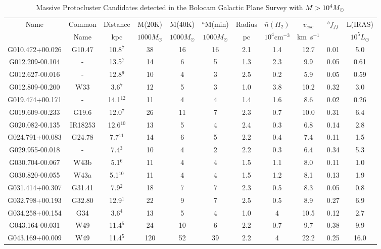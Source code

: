 \begin{table*}
\scriptsize
\begin{center}
\caption{\label{tab:candidates}
Massive Protocluster Candidates detected in the Bolocam Galactic Plane Survey with $M>10^4 M_{\odot}$ }
\begin{tabular}{ccccccccccc}
\hline
Name & Common & Distance & M(20K) & M(40K) & $^a$M(min) & Radius & $\bar{n}(H_2)$ & $v_{esc}$ & $^bf_{ff}$ & L(IRAS) \\
 & Name & kpc & $1000 M_{\odot}$ & $1000 M_{\odot}$ & $1000 M_{\odot}$ & pc & $10^4$cm$^{-3}$ & km~s$^{-1}$ &  & $10^5 L_{\odot}$ \\
\hline\hline
G010.472+00.026 & G10.47 & 10.8$^{7}$ & 38 & 16 & 16 & 2.1 & 1.4 & 12.7 & 0.01 & 5.0 \\
G012.209-00.104 & - & 13.5$^{7}$ & 14 & 6 & 5 & 1.3 & 2.3 & 9.9 & 0.05 & 0.61 \\
G012.627-00.016 & - & 12.8$^{9}$ & 10 & 4 & 3 & 2.5 & 0.2 & 5.9 & 0.05 & 0.59 \\
G012.809-00.200 & W33 & 3.6$^{7}$ & 12 & 5 & 3 & 1.0 & 3.8 & 10.2 & 0.32 & 3.0 \\
G019.474+00.171 & - & 14.1$^{12}$ & 11 & 4 & 4 & 1.4 & 1.6 & 8.6 & 0.02 & 0.26 \\
G019.609-00.233 & G19.6 & 12.0$^{7}$ & 26 & 11 & 7 & 2.3 & 0.7 & 10.0 & 0.31 & 6.4 \\
G020.082-00.135 & IR18253 & 12.6$^{10}$ & 13 & 5 & 4 & 2.4 & 0.3 & 6.8 & 0.14 & 2.8 \\
G024.791+00.083 & G24.78 & 7.7$^{11}$ & 14 & 6 & 5 & 2.2 & 0.4 & 7.4 & 0.11 & 1.5 \\
G029.955-00.018 & - & 7.4$^{3}$ & 10 & 4 & 2 & 2.2 & 0.3 & 6.4 & 0.34 & 5.3 \\
G030.704-00.067 & W43b & 5.1$^{6}$ & 11 & 4 & 4 & 1.5 & 1.1 & 8.0 & 0.11 & 1.0 \\
G030.820-00.055 & W43a & 5.1$^{10}$ & 11 & 4 & 4 & 1.5 & 1.2 & 8.1 & 0.13 & 1.9 \\
G031.414+00.307 & G31.41 & 7.9$^{2}$ & 18 & 7 & 7 & 2.3 & 0.5 & 8.3 & 0.05 & 0.8 \\
G032.798+00.193 & G32.80 & 12.9$^{1}$ & 22 & 9 & 7 & 2.5 & 0.5 & 8.9 & 0.27 & 6.9 \\
G034.258+00.154 & G34 & 3.6$^{4}$ & 13 & 5 & 4 & 1.0 & 4 & 10.5 & 0.12 & 2.7 \\
G043.164-00.031 & W49 & 11.4$^{5}$ & 24 & 10 & 6 & 2.2 & 0.7 & 9.7 & 0.38 & 9.9 \\
G043.169+00.009 & W49 & 11.4$^{5}$ & 120 & 52 & 39 & 2.2 & 4 & 22.2 & 0.25 & 16.0 \\

\end{tabular}
\end{center}
\end{table*}
